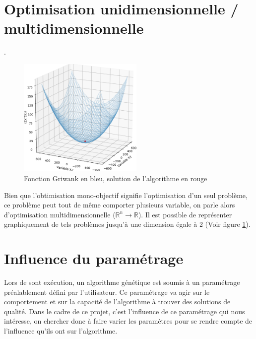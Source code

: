 \documentclass[12pt]{report}
\begin{document}
    \section{Optimisation unidimensionnelle / multidimensionnelle}.
      \begin{figure}
        \centering
        \includegraphics[width=6cm]{img/3,2.png}
        \caption{Fonction Griwank \cite{wiki5} en bleu, solution de l'algorithme en rouge}
        \label{ex_r2}
      \end{figure}
      Bien que l'obtimisation mono-objectif signifie l'optimisation d'un seul problème, ce problème peut tout de même comporter plusieurs variable, on parle alors d'optimisation multidimensionnelle ($\mathbb{R}^n \rightarrow \mathbb{R}$). Il est possible de représenter graphiquement de tels problèmes jusqu'à une dimension égale à 2 (Voir figure \ref{ex_r2}).

    \section{Influence du paramétrage }
      Lors de sont exécution, un algorithme génétique est soumis à un paramétrage préalablement défini par l'utilisateur. Ce paramétrage va agir sur le comportement et sur la capacité de l'algorithme à trouver des solutions de qualité. Dans le cadre de ce projet, c'est  l'influence de ce paramétrage qui nous intéresse, on chercher donc à faire varier les paramètres pour se rendre compte de l'influence qu'ils ont sur l'algorithme.
\end{document}
